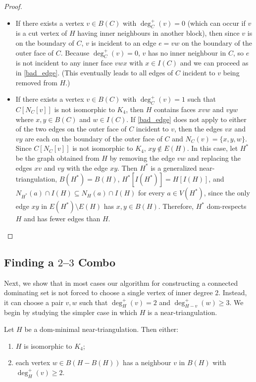 \documentclass{patmorin}
\begin{document}
\begin{proof}
\begin{itemize}[labelwidth=, leftmargin=!]
    \item [\ref{bad_vertex}] If there exists a vertex $v\in B(C)$ with $\deg^+_C(v)=0$ (which can occur if $v$ is a cut vertex of $H$ having inner neighbours in another block), then since $v$ is on the boundary of $C$, $v$ is incident to an edge $e=vw$ on the boundary of the outer face of $C$. Because $\deg^+_C(v)=0$, $v$ has no inner neighbour in $C$, so $e$ is not incident to any inner face $vwx$ with $x\in I(C)$ and we can proceed as in \ref{bad_edge}.  (This eventually leads to all edges of $C$ incident to $v$ being removed from $H$.)

    \item [\ref{inner_degree_1}] If there exists a vertex $v\in B(C)$ with $\deg^+_C(v)=1$ such that $C[N_C[v]]$ is not isomorphic to $K_4$, then $H$ contains faces $xvw$ and $vyw$ where $x,y\in B(C)$ and $w\in I(C)$.  If \ref{bad_edge} does not apply to either of the two edges on the outer face of $C$ incident to $v$, then the edges $vx$ and $vy$ are each on the boundary of the outer face of $C$ and $N_C(v)=\{x,y,w\}$. Since $C[N_C[v]]$ is not isomorphic to $K_4$, $xy\not\in E(H)$.  In this case, let $H^*$ be the graph obtained from $H$ by removing the edge $vw$ and replacing the edges $xv$ and $vy$ with the edge $xy$. Then $H^*$ is a generalized near-triangulation, $B(H^*)=B(H)$, $H^*[I(H^*)]=H[I(H)]$, and $N_{H^*}(a)\cap I(H)\subseteq N_H(a)\cap I(H)$ for every $a\in V(H^*)$, since the only edge $xy$ in $E(H^*)\setminus E(H)$ has $x,y\in B(H)$. Therefore, $H^*$ dom-respects $H$ and has fewer edges than $H$. \qedhere
  \end{itemize}
\end{proof}

\subsection{Finding a \texorpdfstring{$2$--$3$}{2-3} Combo}
\label{combo}

Next, we show that in most cases our algorithm for constructing a connected dominating set is not forced to choose a single vertex of inner degree $2$. Instead, it can choose a pair $v,w$ such that $\deg^+_H(v)=2$ and $\deg^+_{H-v}(w)\ge 3$. We begin by studying the simpler case in which $H$ is a near-triangulation.

\begin{lem}\label{degree_2_outer_neighbour}
  Let $H$ be a dom-minimal near-triangulation. Then either:
  \begin{enumerate}[nosep,nolistsep,label=\rm(\arabic*)]
    \item $H$ is isomorphic to $K_4$;
    \item each vertex $w\in B(H-B(H))$ has a neighbour $v$ in $B(H)$ with $\deg^+_H(v)\ge 2$.
  \end{enumerate}
\end{lem}
\end{document}
